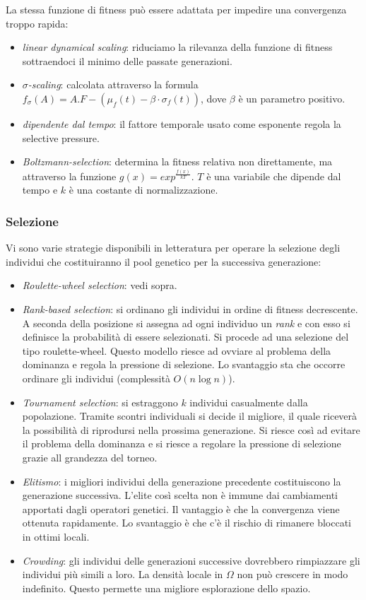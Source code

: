 \documentclass[10pt,a4paper]{article}
\begin{document}
La stessa funzione di fitness può essere adattata per impedire una convergenza troppo rapida:

\begin{itemize}
\item{\emph{linear dynamical scaling}: riduciamo la rilevanza della funzione di fitness sottraendoci il minimo delle passate generazioni.}
\item{\emph{$\sigma$-scaling}: calcolata attraverso la formula $f_{\sigma}(A) = A.F - (\mu_f(t) - \beta \cdot \sigma_f(t))$, dove $\beta$ è un parametro positivo.}
\item{\emph{dipendente dal tempo}: il fattore temporale usato come esponente regola la selective pressure.}
\item{\emph{Boltzmann-selection}: determina la fitness relativa non direttamente, ma attraverso la funzione $g(x) = exp^{\frac{f(x)}{kT}}$. $T$ è una variabile che dipende dal tempo e $k$ è una costante di normalizzazione.}
\end{itemize}

\subsubsection{Selezione}

Vi sono varie strategie disponibili in letteratura per operare la selezione degli individui che costituiranno il pool genetico per la successiva generazione:

\begin{itemize}
\item{\emph{Roulette-wheel selection}: vedi sopra.}
\item{\emph{Rank-based selection}: si ordinano gli individui in ordine di fitness decrescente. A seconda della posizione si assegna ad ogni individuo un \emph{rank} e con esso si definisce la probabilità di essere selezionati. Si procede ad una selezione del tipo roulette-wheel. Questo modello riesce ad ovviare al problema della dominanza e regola la pressione di selezione. Lo svantaggio sta che occorre ordinare gli individui (complessità $O(n \log n)$).}
\item{\emph{Tournament selection}: si estraggono $k$ individui casualmente dalla popolazione. Tramite scontri individuali si decide il migliore, il quale riceverà la possibilità di riprodursi nella prossima generazione. Si riesce così ad evitare il problema della dominanza e si riesce a regolare la pressione di selezione grazie all grandezza del torneo.}
\item{\emph{Elitismo}: i migliori individui della generazione precedente costituiscono la generazione successiva. L'elite così scelta non è immune dai cambiamenti apportati dagli operatori genetici. Il vantaggio è che la convergenza viene ottenuta rapidamente. Lo svantaggio è che c'è il rischio di rimanere bloccati in ottimi locali.}
\item{\emph{Crowding}: gli individui delle generazioni successive dovrebbero rimpiazzare gli individui più simili a loro. La densità locale in $\Omega$ non può crescere in modo indefinito. Questo permette una migliore esplorazione dello spazio.}
\end{itemize}
\end{document}
